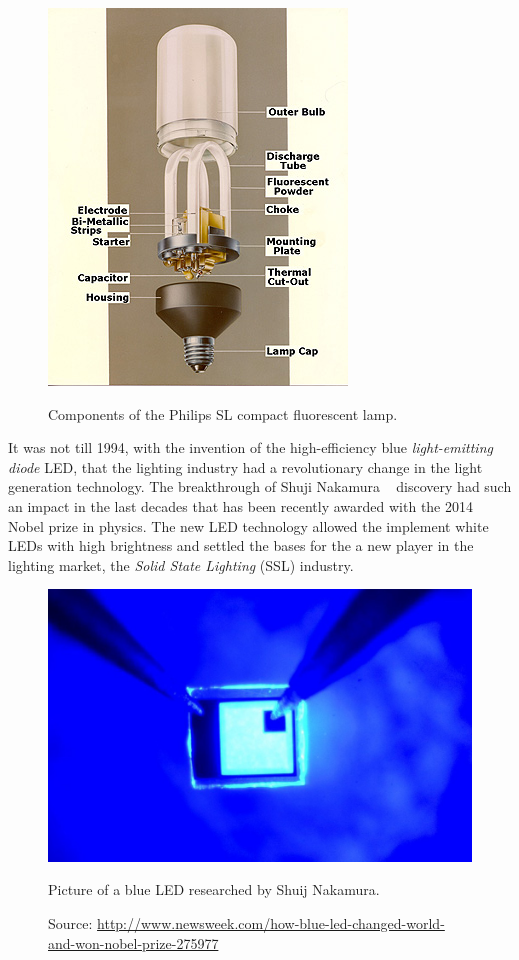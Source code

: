 \begin{figure}[!h]
\centering
\includegraphics{./0_intro/img/phil1b.jpg}
\label{fig:philips_sl}
\caption{Components of the Philips SL compact fluorescent lamp. }
\end{figure}


It was not till 1994, with the invention of the high-efficiency blue \emph{light-emitting diode} LED, that the lighting industry had a revolutionary change in the light generation technology. The breakthrough of Shuji Nakamura ~\cite{94Nakamura} discovery had such an impact in the last decades that has been recently awarded with the 2014 Nobel prize in physics. The new LED technology allowed the implement white LEDs with high brightness and settled the bases for the a new player in the lighting market, the \emph{Solid State Lighting} (SSL) industry.


\begin{figure}[!h]
\centering
\includegraphics{./0_intro/img/10-7-14-nobel-prize-blue-led.jpg}
\label{fig:blue_LED}
\caption{Picture of a blue LED researched by Shuij Nakamura.}
\caption*{Source: \url{http://www.newsweek.com/how-blue-led-changed-world-and-won-nobel-prize-275977} }
\end{figure}

